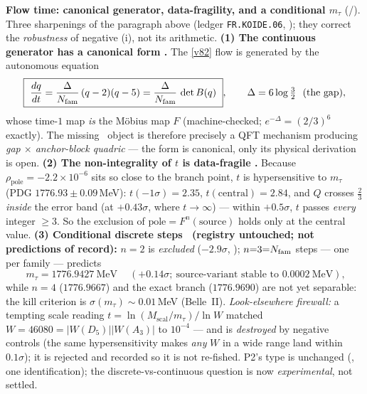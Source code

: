 \par\smallskip\noindent\textbf{Flow time: canonical generator, data-fragility, and a conditional $m_\tau$} (\mE/\mC).
Three sharpenings of the paragraph above (ledger \texttt{FR.KOIDE.06}, ); they correct the \emph{robustness} of
negative (i), not its arithmetic. \textbf{(1) The continuous generator has a canonical form \mE.} The \vref{v82}
flow is generated by the autonomous equation
\[
  \boxed{\ \frac{dq}{dt}=\frac{\Delta}{\Nfam}\,(q-2)(q-5)=\frac{\Delta}{\Nfam}\,\det B(q)\ },\qquad
  \Delta=6\log\tfrac32\ \ (\text{the gap}),
\]
whose time-$1$ map \emph{is} the M\"obius map $F$ (machine-checked; $e^{-\Delta}=(2/3)^6$ exactly). The
missing \mC\ object is therefore precisely a QFT mechanism producing \emph{gap $\times$ anchor-block
quadric} --- the form is canonical, only its physical derivation is open. \textbf{(2) The non-integrality
of $t$ is data-fragile \mE.} Because $\rho_{\mathrm{pole}}=-2.2\times10^{-6}$ sits so close to the branch
point, $t$ is hypersensitive to $m_\tau$ (PDG $1776.93\pm0.09$\,MeV): $t(-1\sigma)=2.35$,
$t(\mathrm{central})=2.84$, and $Q$ crosses $\tfrac23$ \emph{inside} the error band (at $+0.43\sigma$,
where $t\to\infty$) --- within $+0.5\sigma$, $t$ passes \emph{every} integer $\ge3$. So the exclusion of
$\mathrm{pole}=F^n(\mathrm{source})$ holds only at the central value. \textbf{(3) Conditional discrete
steps \mC\ (registry untouched; not predictions of record):} $n{=}2$ is \emph{excluded} ($-2.9\sigma$,
\mE); $n{=}3{=}N_{\mathrm{fam}}$ steps --- one per family --- predicts
\[
  \boxed{\ m_\tau=1776.9427\ \mathrm{MeV}\ }\quad(+0.14\sigma;\ \text{source-variant stable to }0.0002\ \mathrm{MeV}),
\]
while $n{=}4$ ($1776.9667$) and the exact branch ($1776.9690$) are not yet separable: the kill criterion
is $\sigma(m_\tau)\!\sim\!0.01$\,MeV (Belle~II). \emph{Look-elsewhere firewall:} a tempting scale reading
$t=\ln(M_{\mathrm{scal}}/m_\tau)/\ln W$ matched $W=46080=|W(D_5)||W(A_3)|$ to $10^{-4}$ --- and is
\emph{destroyed} by negative controls (the same hypersensitivity makes \emph{any} $W$ in a wide range land
within $0.1\sigma$); it is rejected and recorded so it is not re-fished. P2's type is unchanged (\mC, one
identification); the discrete-vs-continuous question is now \emph{experimental}, not settled.

